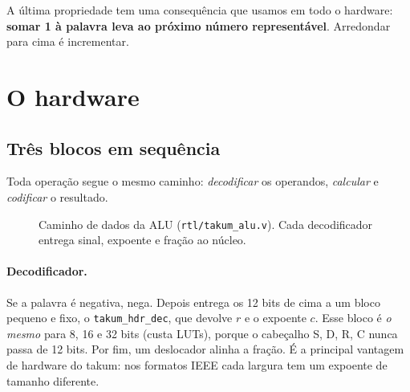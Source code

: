 \documentclass[11pt,a4paper]{article}
\newcommand{\code}[1]{\texttt{#1}}
\begin{document}
A última propriedade tem uma consequência que usamos em todo o hardware: \textbf{somar 1 à palavra leva
ao próximo número representável}. Arredondar para cima é incrementar.

\section{O hardware}

\subsection{Três blocos em sequência}

Toda operação segue o mesmo caminho: \emph{decodificar} os operandos, \emph{calcular} e \emph{codificar}
o resultado.

\begin{figure}[H]
\centering
{}
\caption{Caminho de dados da ALU (\code{rtl/takum\_alu.v}). Cada decodificador entrega sinal,
expoente e fração ao núcleo.}
\end{figure}

\paragraph{Decodificador.} Se a palavra é negativa, nega. Depois entrega os 12 bits de cima a um bloco
pequeno e fixo, o \code{takum\_hdr\_dec}, que devolve $r$ e o expoente $c$. Esse bloco é \emph{o mesmo}
para 8, 16 e 32 bits (custa \HWHDR{} LUTs), porque o cabeçalho S, D, R, C nunca passa de 12 bits. Por
fim, um deslocador alinha a fração. É a principal vantagem de hardware do takum: nos formatos IEEE cada
largura tem um expoente de tamanho diferente.
\end{document}
